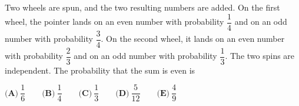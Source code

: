 Two wheels are spun, and the two resulting numbers are added. On the first wheel, the pointer lands on an even number with probability $\dfrac{1}{4}$ and on an odd number with probability $\dfrac{3}{4}$. On the second wheel, it lands on an even number with probability $\dfrac{2}{3}$ and on an odd number with probability $\dfrac{1}{3}$. The two spins are independent. The probability that the sum is even is

$\textbf{(A)}\ \dfrac{1}{6}\qquad\textbf{(B)}\ \dfrac{1}{4}\qquad\textbf{(C)}\ \dfrac{1}{3}\qquad\textbf{(D)}\ \dfrac{5}{12}\qquad\textbf{(E)}\ \dfrac{4}{9}$
